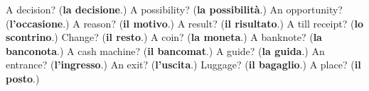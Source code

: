 \begin{tcolorbox}[breakable,colback=teal!4,colframe=teal!35!black,title={Before you move on}]
A decision? (\textbf{la decisione}.) A possibility? (\textbf{la possibilità}.) An opportunity? (\textbf{l'occasione}.) A reason? (\textbf{il motivo}.) A result? (\textbf{il risultato}.) A till receipt? (\textbf{lo scontrino}.) Change? (\textbf{il resto}.) A coin? (\textbf{la moneta}.) A banknote? (\textbf{la banconota}.) A cash machine? (\textbf{il bancomat}.) A guide? (\textbf{la guida}.) An entrance? (\textbf{l'ingresso}.) An exit? (\textbf{l'uscita}.) Luggage? (\textbf{il bagaglio}.) A place? (\textbf{il posto}.)
\end{tcolorbox}
